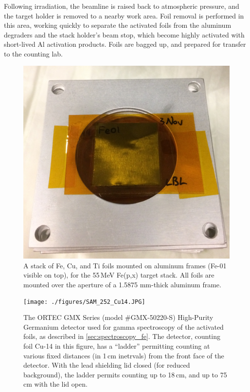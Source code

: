 Following irradiation, the beamline is raised back to atmospheric pressure, and the target holder is removed to a nearby work area.
Foil removal is performed in this area, working quickly to separate the activated foils from the aluminum degraders and the stack holder's beam stop, which
become highly activated with short-lived Al activation products.
Foils are bagged up, and prepared for transfer to the counting lab.



\begin{figure}
 \centering
 \includegraphics[width=0.5\columnwidth]{./figures/IMG_0305.jpg}
 \caption{A stack of Fe, Cu, and Ti foils mounted on aluminum frames (Fe-01 visible on top), for the 55\,MeV Fe(p,x) target stack. All foils are mounted over the aperture of a 1.5875 mm-thick aluminum frame.}
 \label{fig:fe_IMG_0305}
\end{figure}



\begin{figure}
 \centering
 \texttt{[image: ./figures/SAM\_252\_Cu14.JPG]}
 \caption{The ORTEC GMX Series (model \#GMX-50220-S)  High-Purity Germanium detector used for gamma spectroscopy of the activated foils, as described in \autoref{sec:spectroscopy_fe}. The detector, counting foil Cu-14 in this figure, has a \enquote{ladder} permitting counting at various fixed distances (in 1\,cm inetrvals) from the front face of the detector. With the lead shielding lid closed (for reduced background), the ladder permits counting up to 18\,cm, and up to 75\,cm with the lid open.   }
 \label{fig:fe_IMG_1984}
\end{figure}



